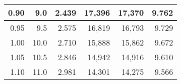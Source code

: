 \begin{longtable}{|r|r|r|r|r|r|}
			0.90                                                                                                   & 9.0                                                                                                   & 2.439                                                                                          & 17,396                                             & 17,370                                                    & 9.762                                             \\ \hline
			0.95                                                                                                   & 9.5                                                                                                   & 2.575                                                                                          & 16,819                                             & 16,793                                                    & 9.729                                             \\ \hline
			1.00                                                                                                   & 10.0                                                                                                  & 2.710                                                                                          & 15,888                                             & 15,862                                                    & 9.672                                             \\ \hline
			1.05                                                                                                   & 10.5                                                                                                  & 2.846                                                                                          & 14,942                                             & 14,916                                                    & 9.610                                             \\ \hline
			1.10                                                                                                   & 11.0                                                                                                  & 2.981                                                                                          & 14,301                                             & 14,275                                                    & 9.566                                             \\ \hline

\end{longtable}
